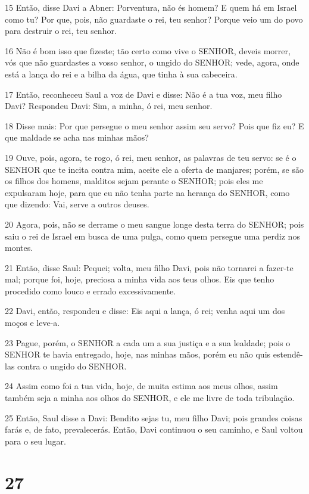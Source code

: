 \par 15 Então, disse Davi a Abner: Porventura, não és homem? E quem há em Israel como tu? Por que, pois, não guardaste o rei, teu senhor? Porque veio um do povo para destruir o rei, teu senhor.
\par 16 Não é bom isso que fizeste; tão certo como vive o SENHOR, deveis morrer, vós que não guardastes a vosso senhor, o ungido do SENHOR; vede, agora, onde está a lança do rei e a bilha da água, que tinha à sua cabeceira.
\par 17 Então, reconheceu Saul a voz de Davi e disse: Não é a tua voz, meu filho Davi? Respondeu Davi: Sim, a minha, ó rei, meu senhor.
\par 18 Disse mais: Por que persegue o meu senhor assim seu servo? Pois que fiz eu? E que maldade se acha nas minhas mãos?
\par 19 Ouve, pois, agora, te rogo, ó rei, meu senhor, as palavras de teu servo: se é o SENHOR que te incita contra mim, aceite ele a oferta de manjares; porém, se são os filhos dos homens, malditos sejam perante o SENHOR; pois eles me expulsaram hoje, para que eu não tenha parte na herança do SENHOR, como que dizendo: Vai, serve a outros deuses.
\par 20 Agora, pois, não se derrame o meu sangue longe desta terra do SENHOR; pois saiu o rei de Israel em busca de uma pulga, como quem persegue uma perdiz nos montes.
\par 21 Então, disse Saul: Pequei; volta, meu filho Davi, pois não tornarei a fazer-te mal; porque foi, hoje, preciosa a minha vida aos teus olhos. Eis que tenho procedido como louco e errado excessivamente.
\par 22 Davi, então, respondeu e disse: Eis aqui a lança, ó rei; venha aqui um dos moços e leve-a.
\par 23 Pague, porém, o SENHOR a cada um a sua justiça e a sua lealdade; pois o SENHOR te havia entregado, hoje, nas minhas mãos, porém eu não quis estendê-las contra o ungido do SENHOR.
\par 24 Assim como foi a tua vida, hoje, de muita estima aos meus olhos, assim também seja a minha aos olhos do SENHOR, e ele me livre de toda tribulação.
\par 25 Então, Saul disse a Davi: Bendito sejas tu, meu filho Davi; pois grandes coisas farás e, de fato, prevalecerás. Então, Davi continuou o seu caminho, e Saul voltou para o seu lugar.

\chapter{27}


